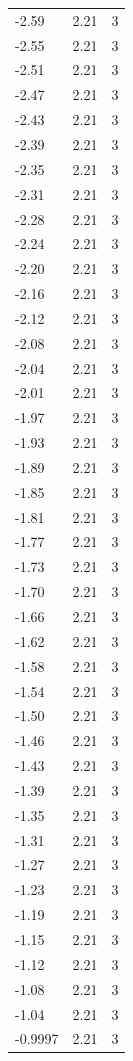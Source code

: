 \begin{longtable}{lrr}
  -2.59 & 2.21 & 3 \\
  -2.55 & 2.21 & 3 \\
  -2.51 & 2.21 & 3 \\
  -2.47 & 2.21 & 3 \\
  -2.43 & 2.21 & 3 \\
  -2.39 & 2.21 & 3 \\
  -2.35 & 2.21 & 3 \\
  -2.31 & 2.21 & 3 \\
  -2.28 & 2.21 & 3 \\
  -2.24 & 2.21 & 3 \\
  -2.20 & 2.21 & 3 \\
  -2.16 & 2.21 & 3 \\
  -2.12 & 2.21 & 3 \\
  -2.08 & 2.21 & 3 \\
  -2.04 & 2.21 & 3 \\
  -2.01 & 2.21 & 3 \\
  -1.97 & 2.21 & 3 \\
  -1.93 & 2.21 & 3 \\
  -1.89 & 2.21 & 3 \\
  -1.85 & 2.21 & 3 \\
  -1.81 & 2.21 & 3 \\
  -1.77 & 2.21 & 3 \\
  -1.73 & 2.21 & 3 \\
  -1.70 & 2.21 & 3 \\
  -1.66 & 2.21 & 3 \\
  -1.62 & 2.21 & 3 \\
  -1.58 & 2.21 & 3 \\
  -1.54 & 2.21 & 3 \\
  -1.50 & 2.21 & 3 \\
  -1.46 & 2.21 & 3 \\
  -1.43 & 2.21 & 3 \\
  -1.39 & 2.21 & 3 \\
  -1.35 & 2.21 & 3 \\
  -1.31 & 2.21 & 3 \\
  -1.27 & 2.21 & 3 \\
  -1.23 & 2.21 & 3 \\
  -1.19 & 2.21 & 3 \\
  -1.15 & 2.21 & 3 \\
  -1.12 & 2.21 & 3 \\
  -1.08 & 2.21 & 3 \\
  -1.04 & 2.21 & 3 \\
  -0.9997 & 2.21 & 3 \\

\end{longtable}
